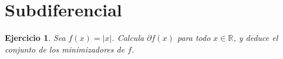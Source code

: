 \documentclass[11pt]{report}
\newtheorem{ex}{Ejercicio}
\begin{document}


\section{Subdiferencial}


\begin{ex}
Sea \( f(x) = |x| \). Calcula \( \partial f(x) \) para todo \( x \in \mathbb{R} \), y deduce el conjunto de los minimizadores de \( f \).
\end{ex}





\end{document}
